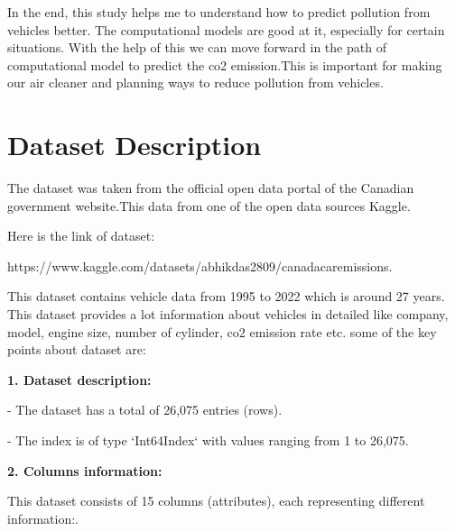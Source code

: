 \documentclass[12pt, a4paper,oneside]{book}
\numberwithin{equation}{section}
\begin{document}
In the end, this study helps me to understand how to predict pollution from vehicles better. The computational models are good at it, especially for certain situations. With the help of this we can move forward in the path of computational model to predict the co2 emission.This is important for making our air cleaner and planning ways to reduce pollution from vehicles.~\cite{ref7}


\chapter{Dataset Description}\label{ch:3}


The dataset was taken from the official open data portal of the Canadian government website.This data from one of the open data sources Kaggle.~\cite{ref1}

Here is the link of dataset:

https://www.kaggle.com/datasets/abhikdas2809/canadacaremissions.~\cite{ref1}


This dataset contains vehicle data from 1995 to 2022 which is around 27 years. This dataset provides a lot information about vehicles in detailed like company, model, engine size, number of cylinder, co2 emission rate etc.
some of the key points about dataset are:

\textbf{1. Dataset description:}

   - The dataset has a total of 26,075 entries (rows).
   
   - The index is of type `Int64Index` with values ranging from 1 to 26,075.

\textbf{2. Columns information:}

   This dataset consists of 15 columns (attributes), each representing different information:.~\cite{ref1}
\end{document}
